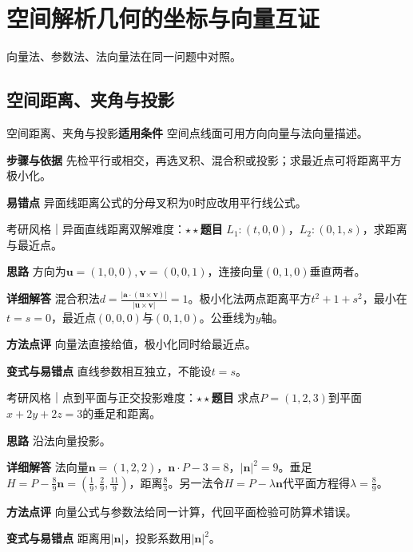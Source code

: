 \section{空间解析几何的坐标与向量互证}\label{deep:geometry_source_deep}

\begin{examtip}向量法、参数法、法向量法在同一问题中对照。\end{examtip}

\subsection{空间距离、夹角与投影}\label{deep:geometry_source_deep:lines}

\begin{method}{空间距离、夹角与投影}\textbf{适用条件} 空间点线面可用方向向量与法向量描述。\par\textbf{步骤与依据} 先检平行或相交，再选叉积、混合积或投影；求最近点可将距离平方极小化。\par\textbf{易错点} 异面线距离公式的分母叉积为0时应改用平行线公式。\end{method}

\begin{example}{考研风格｜异面直线距离双解}{难度：$\star\star$}\label{deep:ex:geometry_source_deep:skew}\textbf{题目} $L_1:(t,0,0)$，$L_2:(0,1,s)$，求距离与最近点。\par\textbf{思路} 方向为$\bm u=(1,0,0),\bm v=(0,0,1)$，连接向量$(0,1,0)$垂直两者。\par\textbf{详细解答} 混合积法$d=\frac{|\bm a\cdot(\bm u\times\bm v)|}{|\bm u\times\bm v|}=1$。极小化法两点距离平方$t^2+1+s^2$，最小在$t=s=0$，最近点$(0,0,0)$与$(0,1,0)$。公垂线为$y$轴。\par\textbf{方法点评} 向量法直接给值，极小化同时给最近点。\par\textbf{变式与易错点} 直线参数相互独立，不能设$t=s$。\end{example}

\begin{example}{考研风格｜点到平面与正交投影}{难度：$\star\star$}\label{deep:ex:geometry_source_deep:projection}\textbf{题目} 求点$P=(1,2,3)$到平面$x+2y+2z=3$的垂足和距离。\par\textbf{思路} 沿法向量投影。\par\textbf{详细解答} 法向量$\bm n=(1,2,2)$，$\bm n\cdot P-3=8$，$|\bm n|^2=9$。垂足$H=P-\frac89\bm n=(\frac{1}{9},\frac{2}{9},\frac{11}{9})$，距离$\frac{8}{3}$。另一法令$H=P-\lambda\bm n$代平面方程得$\lambda=\frac{8}{9}$。\par\textbf{方法点评} 向量公式与参数法给同一计算，代回平面检验可防算术错误。\par\textbf{变式与易错点} 距离用$|\bm n|$，投影系数用$|\bm n|^2$。\end{example}

